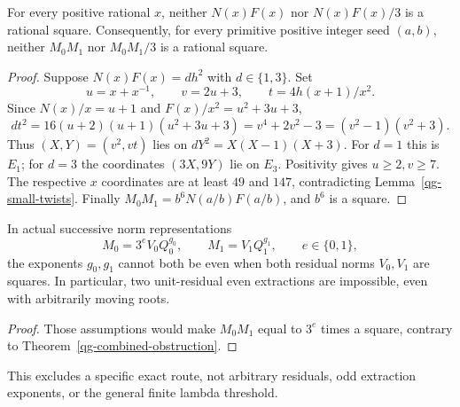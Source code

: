 \begin{theorem}
\label{qg-combined-obstruction}
For every positive rational $x$, neither $N(x)F(x)$ nor $N(x)F(x)/3$ is
a rational square. Consequently, for every primitive positive integer
seed $(a,b)$, neither $M_0M_1$ nor $M_0M_1/3$ is a rational square.
\end{theorem}
\begin{proof}
Suppose $N(x)F(x)=dh^2$ with $d\in\{1,3\}$. Set
\[
 u=x+x^{-1},\qquad v=2u+3,\qquad t=4h(x+1)/x^2.
\]
Since $N(x)/x=u+1$ and $F(x)/x^2=u^2+3u+3$,
\begin{equation}\label{qg-reciprocal-identity}
 dt^2=16(u+2)(u+1)(u^2+3u+3)
     =v^4+2v^2-3=(v^2-1)(v^2+3).
\end{equation}
Thus $(X,Y)=(v^2,vt)$ lies on $dY^2=X(X-1)(X+3)$.
For $d=1$ this is $E_1$; for $d=3$ the coordinates $(3X,9Y)$ lie on
$E_3$. Positivity gives $u\ge2,v\ge7$. The respective $x$ coordinates
are at least $49$ and $147$, contradicting Lemma~\ref{qg-small-twists}.
Finally $M_0M_1=b^6N(a/b)F(a/b)$, and $b^6$ is a square.
\end{proof}

\begin{corollary}
\label{qg-even-exponents}
In actual successive norm representations
\[
 M_0=3^eV_0Q_0^{g_0},\qquad M_1=V_1Q_1^{g_1},
 \qquad e\in\{0,1\},
\]
the exponents $g_0,g_1$ cannot both be even when both residual norms
$V_0,V_1$ are squares. In particular, two unit-residual even extractions
are impossible, even with arbitrarily moving roots.
\end{corollary}
\begin{proof}
Those assumptions would make $M_0M_1$ equal to $3^e$ times a square,
contrary to Theorem~\ref{qg-combined-obstruction}.
\end{proof}
This excludes a specific exact route, not arbitrary residuals, odd
extraction exponents, or the general finite lambda threshold.


